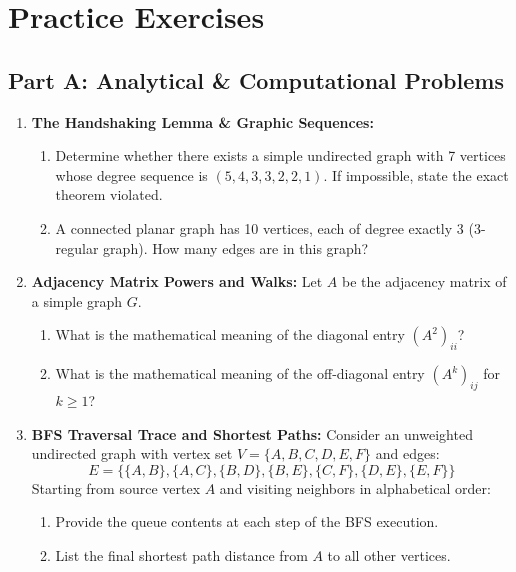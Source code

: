 \newpage
\section{Practice Exercises}

\subsection*{Part A: Analytical \& Computational Problems}

\begin{enumerate}
    \item \textbf{The Handshaking Lemma \& Graphic Sequences:}
    \begin{enumerate}
        \item Determine whether there exists a simple undirected graph with 7 vertices whose degree sequence is $(5, 4, 3, 3, 2, 2, 1)$. If impossible, state the exact theorem violated.
        \item A connected planar graph has 10 vertices, each of degree exactly 3 ($3$-regular graph). How many edges are in this graph?
    \end{enumerate}

    \item \textbf{Adjacency Matrix Powers and Walks:}
    Let $A$ be the adjacency matrix of a simple graph $G$.
    \begin{enumerate}
        \item What is the mathematical meaning of the diagonal entry $(A^2)_{ii}$?
        \item What is the mathematical meaning of the off-diagonal entry $(A^k)_{ij}$ for $k \ge 1$?
    \end{enumerate}

    \item \textbf{BFS Traversal Trace and Shortest Paths:}
    Consider an unweighted undirected graph with vertex set $V = \{A, B, C, D, E, F\}$ and edges:
    \begin{equation}
    E = \{\{A, B\}, \{A, C\}, \{B, D\}, \{B, E\}, \{C, F\}, \{D, E\}, \{E, F\}\}
    \end{equation}
    Starting from source vertex $A$ and visiting neighbors in alphabetical order:
    \begin{enumerate}
        \item Provide the queue contents at each step of the BFS execution.
        \item List the final shortest path distance from $A$ to all other vertices.
    \end{enumerate}


\end{enumerate}
